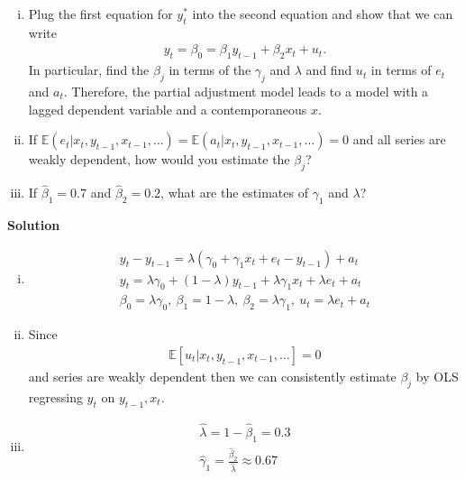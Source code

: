 \documentclass[a4paper]{article}
\newcommand{\expect}{\mathbb{E}}
\begin{document}
\begin{enumerate}[(i)]
	\item  Plug the first equation for $y_t^*$ into the second equation and show that we can write
	\begin{align*}
	y_t = \beta_0 = \beta_1 y_{t-1} + \beta_2 x_{t}+u_t.
	\end{align*}
	In particular, find the $\beta_j$ in terms of the $\gamma_j$ and $\lambda$ and find $u_t$ in terms of $e_t$ and $a_t$. Therefore, the partial adjustment model leads to a model with a lagged dependent variable and a contemporaneous $x$. 
	\item  If $\expect(e_t|x_t, y_{t-1}, x_{t-1}, \dots) = \expect(a_t|x_t, y_{t-1}, x_{t-1},\dots) = 0$ and all series are weakly dependent, how would you estimate the $\beta_j$? 
	\item If $\hat{\beta}_1 = 0.7$ and $\hat{\beta}_2=0.2$, what are the estimates of $\gamma_1$ and $\lambda$?
\end{enumerate}


\textbf{Solution}

\begin{enumerate}[(i)]
	\item \begin{align*}
	y_t - y_{t-1} = \lambda(\gamma_0 + \gamma_1 x_t + e_t - y_{t-1}) + a_t\\
	y_t = \lambda \gamma_0 + (1 - \lambda)y_{t-1} + \lambda \gamma_1 x_t + \lambda e_t + a_t\\
	\beta_0 = \lambda \gamma_0,\ \beta_1 = 1 - \lambda,\ \beta_2 = \lambda \gamma_1,\ u_t = \lambda e_t + a_t
	\end{align*}
	\item Since
	\begin{align*}
	\expect[u_t|x_t, y_{t-1}, x_{t-1}, \dots] = 0
	\end{align*}
	and series are weakly dependent then we can consistently estimate $\beta_j$ by OLS regressing $y_t$ on $y_{t-1}, x_{t}$.
	\item \begin{align*}
	\hat{\lambda} = 1 - \hat{\beta}_1 = 0.3\\
	\hat{\gamma}_1 = \frac{\hat{\beta}_2}{\hat{\lambda}} \approx 0.67
	\end{align*}
\end{enumerate}
\end{document}
